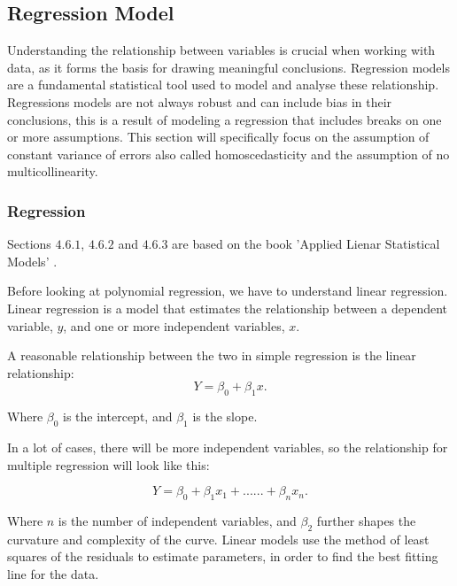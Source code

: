 \subsection{Regression Model}
Understanding the relationship between variables is crucial when working with data, as it forms the basis for drawing meaningful conclusions. Regression models are a fundamental statistical tool used to model and analyse these relationship. Regressions models are not always robust and can include bias in their conclusions, this is a result of modeling a regression that includes breaks on one or more assumptions. This section will specifically focus on the assumption of constant variance of errors also called homoscedasticity and the assumption of no multicollinearity.

\subsubsection{Regression}
Sections $4.6.1$, $4.6.2$ and $4.6.3$ are based on the book 'Applied Lienar Statistical Models' \cite{AppliedLSM}. 
\newline 

\noindent Before looking at polynomial regression, we have to understand linear regression. \newline 
Linear regression is a model that estimates the relationship between a dependent variable, \( y \), and one or more independent variables, \( x \).

\noindent A reasonable relationship between the two in simple regression is the linear relationship:
\begin{equation}
Y = \beta_0 + \beta_1 x .
\end{equation}


\noindent Where \( \beta_0 \) is the intercept, and \( \beta_1 \) is the slope.

\noindent In a lot of cases, there will be more independent variables, so the relationship for multiple regression will look like this:

\begin{equation}
	Y = \beta_0 + \beta_1 x_1 + ......+ \beta_n x_n .
\end{equation}




\noindent Where \( n \) is the number of independent variables, and $\beta_2$ further shapes the curvature and complexity of the curve. Linear models use the method of least squares of the residuals to estimate parameters, in order to find the best fitting line for the data.

